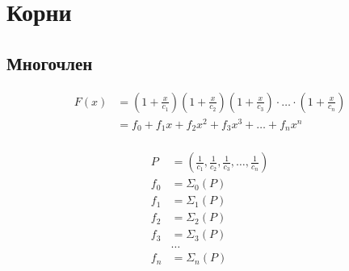 
\chapter{Корни}

\section{Многочлен}

\begin{equation*} \begin{aligned}
F(x) &= 
\left(1 + \frac{x}{c_1} \right) 
\left(1 + \frac{x}{c_2} \right) 
\left(1 + \frac{x}{c_3} \right) 
\cdot \ldots \cdot
\left(1 + \frac{x}{c_n} \right) \\ &=
f_0 + f_1 x + f_2 x^2 + f_3 x^3 + \ldots + f_n x^n \\
\end{aligned} \end{equation*}

\begin{equation*} \begin{aligned}
P &=
\left(
\frac{1}{c_1},
\frac{1}{c_2},
\frac{1}{c_3},
{} \ldots,
\frac{1}{c_n}
\right) \\
f_0 &= \Sigma_0(P) \\ 
f_1 &= \Sigma_1(P) \\
f_2 &= \Sigma_2(P) \\
f_3 &= \Sigma_3(P) \\
&\ldots \\
f_n &= \Sigma_n(P) \\
\end{aligned} \end{equation*}